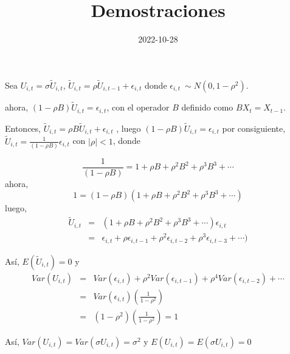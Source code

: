 \documentclass[
]{article}
\title{Demostraciones}
\author{}
\date{\vspace{-2.5em}2022-10-28}
\begin{document}
\maketitle

Sea \(U_{i,t}=\sigma \tilde{U}_{i,t}\),
\(\tilde{U}_{i,t} = \rho\tilde{U}_{i,t-1} + \epsilon_{i,t}\) donde
\(\epsilon_{i,t} ~ \sim N(0, 1-\rho^2)\).

ahora, \((1-\rho B)\tilde{U}_{i,t}=\epsilon_{i,t}\), con el operador
\(B\) definido como \(BX_t = X_{t-1}\).

Entonces, \(\tilde{U}_{i,t} = \rho B \tilde{U}_{i,t} + \epsilon_{i,t}\)
, luego \((1-\rho B)\tilde{U}_{i,t} = \epsilon_{i,t}\) por consiguiente,
\(\tilde{U}_{i,t} = \frac{1}{(1-\rho B)} \epsilon_{i,t}\) con
\(\mid \rho\mid < 1\), donde

\[
\frac{1}{(1-\rho B)} = 1 + \rho B + \rho^2 B^2 + \rho^3 B^3 + \cdots
\] ahora, \[
1 =  (1-\rho B)(1 + \rho B + \rho^2 B^2 + \rho^3 B^3 + \cdots)
\] luego, \[
\begin{eqnarray*}
\tilde{U}_{i,t} &=& (1 + \rho B + \rho^2 B^2 + \rho^3 B^3 + \cdots)\epsilon_{i,t}\\
&=&\epsilon_{i,t} + \rho \epsilon_{i,t-1} + \rho^2 \epsilon_{i,t-2} + \rho^3 \epsilon_{i,t-3} + \cdots)
\end{eqnarray*}
\]

Así, \(E(\tilde{U}_{i,t}) =0\) y \[
\begin{eqnarray*}
Var\left(U_{i,t}\right) & = & Var\left(\epsilon_{i,t}\right)+\rho^{2}Var\left(\epsilon_{i,t-1}\right)+\rho^{4}Var\left(\epsilon_{i,t-2}\right)+\cdots\\
 & = & Var\left(\epsilon_{i,t}\right)\left(\frac{1}{1-\rho^{2}}\right)\\
 & = & \left(1-\rho^{2}\right)\left(\frac{1}{1-\rho^{2}}\right)=1
\end{eqnarray*}
\]

Así, \(Var(U_{i,t})=Var(\sigma U_{i,t})=\sigma^2\) y
\(E(U_{i,t}) = E(\sigma U_{i,t}) = 0\)
\end{document}
